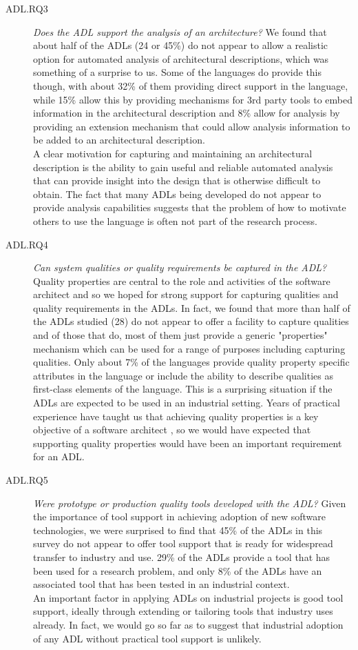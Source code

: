 \begin{description}
\item[ADL.RQ3] \emph{Does the ADL support the analysis of an architecture?}
We found that about half of the ADLs (24 or 45\%) do not appear to allow a realistic option for automated analysis of architectural descriptions, which was something of a surprise to us.  Some of the languages do provide this though, with about 32\% of them providing direct support in the language, while 15\% allow this by providing mechanisms for 3rd party tools to embed information in the architectural description and 8\% allow for analysis by providing an extension mechanism that could allow analysis information to be added to an architectural description. \\
A clear motivation for capturing and maintaining an architectural description is the ability to gain useful and reliable automated analysis that can provide insight into the design that is otherwise difficult to obtain.  The fact that many ADLs being developed do not appear to provide analysis capabilities suggests that the problem of how to motivate others to use the language is often not part of the research process.

\item[ADL.RQ4] \emph{Can system qualities or quality requirements be captured in the ADL?}
Quality properties are central to the role and activities of the software architect and so we hoped for strong support for capturing qualities and quality requirements in the ADLs.  In fact, we found that more than half of the ADLs studied (28) do not appear to offer a facility to capture qualities and of those that do, most of them just provide a generic "properties" mechanism which can be used for a range of purposes including capturing qualities.  Only about 7\% of the languages provide quality property specific attributes in the language or include the ability to describe qualities as first-class elements of the language.  This is a surprising situation if the ADLs are expected to be used in an industrial setting.  Years of practical experience have taught us that achieving quality properties is a key objective of a software architect \cite{brown2018-sad, rozanski2011-ssa2e}, so we would have expected that supporting quality properties would have been an important requirement for an ADL.

\item[ADL.RQ5] \emph{Were prototype or production quality tools developed with the ADL?}
Given the importance of tool support in achieving adoption of new software technologies, we were surprised to find that 45\% of the ADLs in this survey do not appear to offer tool support that is ready for widespread transfer to industry and use.  29\% of the ADLs provide a tool that has been used for a research problem, and only 8\% of the ADLs have an associated tool that has been tested in an industrial context.\\
An important factor in applying ADLs on industrial projects is good tool support, ideally through extending or tailoring tools that industry uses already.  In fact, we would go so far as to suggest that industrial adoption of any ADL without practical tool support is unlikely.


\end{description}
